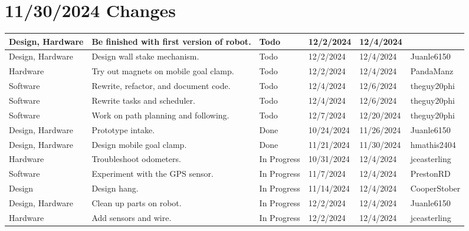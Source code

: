 \section{11/30/2024 Changes}
\begin{center}
\begin{longtable}{| p{40pt} | p{150pt} | p{35pt} | p{33pt} | p{33pt} | p{40pt} |}
\hline \rowcolor{IndianRed1}
Design, Hardware & Be finished with first version of robot. & Todo & 12/2/2024 & 12/4/2024 & \\
\hline \rowcolor{IndianRed1}
Design, Hardware & Design wall stake mechanism. & Todo & 12/2/2024 & 12/4/2024 & Juanle6150 \\
\hline \rowcolor{IndianRed1}
Hardware & Try out magnets on mobile goal clamp. & Todo & 12/2/2024 & 12/4/2024 & PandaManz \\
\hline \rowcolor{IndianRed1}
Software & Rewrite, refactor, and document code. & Todo & 12/4/2024 & 12/6/2024 & theguy20phi \\
\hline \rowcolor{IndianRed1}
Software & Rewrite tasks and scheduler. & Todo & 12/4/2024 & 12/6/2024 & theguy20phi \\
\hline \rowcolor{IndianRed1}
Software & Work on path planning and following. & Todo & 12/7/2024 & 12/20/2024 & theguy20phi \\
\hline \rowcolor{DarkSeaGreen1}
Design, Hardware & Prototype intake. & Done & 10/24/2024 & 11/26/2024 & Juanle6150 \\
\hline \rowcolor{DarkSeaGreen1}
Design, Hardware & Design mobile goal clamp. & Done & 11/21/2024 & 11/30/2024 & hmathis2404 \\
\hline \rowcolor{LightGoldenrod1}
Hardware & Troubleshoot odometers. & In Progress & 10/31/2024 & 12/4/2024 & jceasterling \\
\hline \rowcolor{LightGoldenrod1}
Software & Experiment with the GPS sensor. & In Progress & 11/7/2024 & 12/4/2024 & PrestonRD \\
\hline \rowcolor{LightGoldenrod1}
Design & Design hang. & In Progress & 11/14/2024 & 12/4/2024 & CooperStober \\
\hline \rowcolor{LightGoldenrod1}
Design, Hardware & Clean up parts on robot. & In Progress & 12/2/2024 & 12/4/2024 & Juanle6150 \\
\hline \rowcolor{LightGoldenrod1}
Hardware & Add sensors and wire. & In Progress & 12/2/2024 & 12/4/2024 & jceasterling \\
\hline
\end{longtable}
\end{center}



